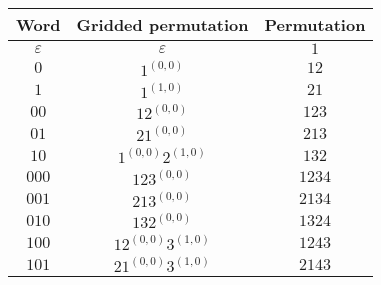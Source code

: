 \begin{tabular}{c|c|c}
    Word & Gridded permutation & Permutation\\
    \hline
    $\varepsilon$ & $\varepsilon$ & $1$\\
    $0$ & $1^{(0,0)}$ & $12$\\
    $1$ & $1^{(1,0)}$ & $21$\\
    $00$ & $12^{(0,0)}$ & $123$\\
    $01$ & $21^{(0,0)}$ & $213$\\
    $10$ & $1^{(0,0)}2^{(1,0)}$ & $132$\\
    $000$ & $123^{(0,0)}$ & $1234$\\
    $001$ & $213^{(0,0)}$ & $2134$\\
    $010$ & $132^{(0,0)}$ & $1324$\\
    $100$ & $12^{(0,0)}3^{(1,0)}$ & $1243$\\
    $101$ & $21^{(0,0)}3^{(1,0)}$ & $2143$\\
\end{tabular}